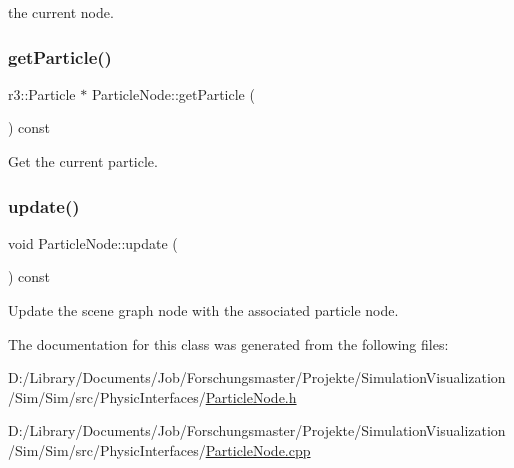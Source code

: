 the current node. \mbox{\label{class_particle_node_a4aaf29e469127cd57a8918f11aacadfb}} 
\subsubsection{\texorpdfstring{get\+Particle()}{getParticle()}}
{\footnotesize\ttfamily r3\+::\+Particle $\ast$ Particle\+Node\+::get\+Particle (\begin{DoxyParamCaption}{ }\end{DoxyParamCaption}) const}



Get the current particle. 

\mbox{\label{class_particle_node_a5324b80595caa65c3e6dbef47ecce09b}} 
\subsubsection{\texorpdfstring{update()}{update()}}
{\footnotesize\ttfamily void Particle\+Node\+::update (\begin{DoxyParamCaption}{ }\end{DoxyParamCaption}) const}



Update the scene graph node with the associated particle node. 



The documentation for this class was generated from the following files\+:\begin{DoxyCompactItemize}
\item 
D\+:/\+Library/\+Documents/\+Job/\+Forschungsmaster/\+Projekte/\+Simulation\+Visualization/\+Sim/\+Sim/src/\+Physic\+Interfaces/\mbox{\hyperlink{_particle_node_8h}{Particle\+Node.\+h}}\item 
D\+:/\+Library/\+Documents/\+Job/\+Forschungsmaster/\+Projekte/\+Simulation\+Visualization/\+Sim/\+Sim/src/\+Physic\+Interfaces/\mbox{\hyperlink{_particle_node_8cpp}{Particle\+Node.\+cpp}}\end{DoxyCompactItemize}
